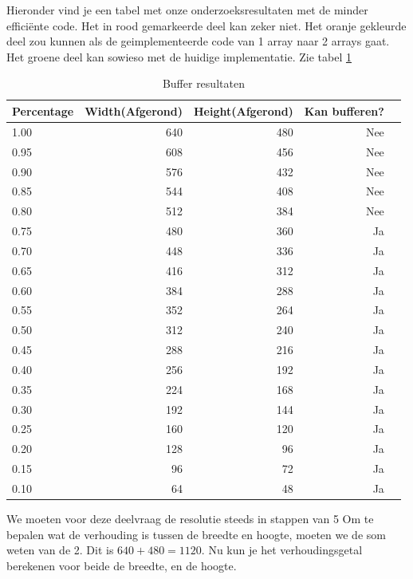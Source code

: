\documentclass{article}
\begin{document}
Hieronder vind je een tabel met onze onderzoeksresultaten met de minder efficiënte code. 
Het in rood gemarkeerde deel kan zeker niet. Het oranje gekleurde deel zou kunnen als de geimplementeerde code van 1 array naar 2 arrays gaat. Het groene deel kan sowieso met de huidige implementatie.
Zie tabel \ref{tab: tabel 1}
\begin{table}[H]\centering
	\caption{Buffer resultaten}\label{tab: tabel 1}
	\scriptsize
	\begin{tabular}{lrrrr}\hline
	\textbf{Percentage} &\textbf{Width(Afgerond)} &\textbf{Height(Afgerond)} &\textbf{Kan bufferen?} \\\hline
	\rowcolor{red}1.00 &640 &480 &Nee \\
	\rowcolor{red}0.95 &608 &456 &Nee \\
	\rowcolor{red}0.90 &576 &432 &Nee \\
	\rowcolor{red}0.85 &544 &408 &Nee \\
	\rowcolor{red}0.80 &512 &384 &Nee \\
	\rowcolor{orange}0.75 &480 &360 &Ja \\
	\rowcolor{orange}0.70 &448 &336 &Ja \\
	\rowcolor{orange}0.65 &416 &312 &Ja \\
	\rowcolor{orange}0.60 &384 &288 &Ja \\
	\rowcolor{green}0.55 &352 &264 &Ja \\
	\rowcolor{green}0.50 &312 &240 &Ja \\
	\rowcolor{green}0.45 &288 &216 &Ja \\
	\rowcolor{green}0.40 &256 &192 &Ja \\
	\rowcolor{green}0.35 &224 &168 &Ja \\
	\rowcolor{green}0.30 &192 &144 &Ja \\
	\rowcolor{green}0.25 &160 &120 &Ja \\
	\rowcolor{green}0.20 &128 &96 &Ja \\
	\rowcolor{green}0.15 &96 &72 &Ja \\
	\rowcolor{green}0.10 &64 &48 &Ja \\
	\hline
	\end{tabular}
	\end{table}

We moeten voor deze deelvraag de resolutie steeds in stappen van 5%
Om te bepalen wat de verhouding is tussen de breedte en hoogte, moeten we de som weten van de 2. Dit is ${640 + 480 = 1120}$. Nu kun je het verhoudingsgetal berekenen voor beide de breedte, en de hoogte.
\end{document}
